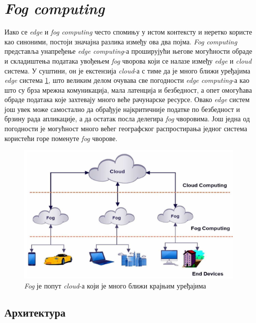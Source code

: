 \section{\textit{Fog computing}}

Иако се \textit{edge} и \textit{fog computing} често спомињу у истом контексту и неретко користе као синоними, постоји значајна разлика између ова два појма. \textit{Fog computing} представља унапређење \textit{edge computing}-а проширујући његове могућности обраде и складиштења података увођењем \textit{fog} чворова који се налазе између \textit{edge} и \textit{cloud} система. У суштини, он је екстензија \textit{cloud}-а с тиме да је много ближи уређајима \textit{edge} система \ref{fig:fog_arch}, што великим делом очувава све погодности \textit{edge computing}-а као што су брза мрежна комуникација, мала латенција и безбедност, а опет омогућава обраде података које захтевају много веће рачунарске ресурсе. Овако \textit{edge} систем још увек може самостално да обрађује најкритичније податке по безбедност и брзину рада апликације, а да остатак посла делегира \textit{fog} чворовима. Још једна од погодности је могућност много већег географског распростирања једног система користећи горе поменуте \textit{fog} чворове. 

\begin{figure}[H]
    \centering
    \includegraphics[width=1\textwidth]{images/fog_arch.png}
    \caption{\textit{Fog} је попут \textit{cloud}-а који је много ближи крајњим уређајима}
    \label{fig:fog_arch}
\end{figure}

\pagebreak
\subsection{Архитектура}

